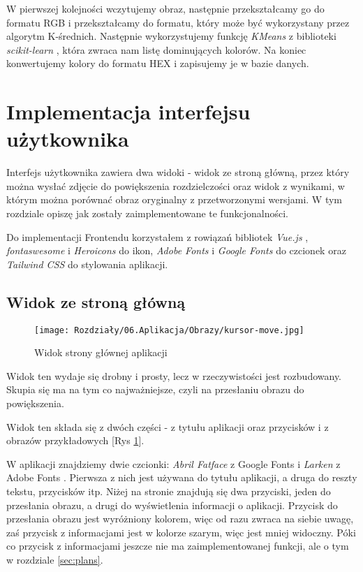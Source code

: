 W pierwszej kolejności wczytujemy obraz, następnie przekształcamy go do formatu RGB i przekształcamy do formatu, który może być wykorzystany przez algorytm K-średnich. Następnie wykorzystujemy funkcję \textit{KMeans} z biblioteki \textit{scikit-learn} \cite{sklearn}, która zwraca nam listę dominujących kolorów. Na koniec konwertujemy kolory do formatu HEX i zapisujemy je w bazie danych.



\section{Implementacja interfejsu użytkownika}

Interfejs użytkownika zawiera dwa widoki - widok ze stroną główną, przez który można wysłać zdjęcie do powiększenia rozdzielczości oraz widok z wynikami, w którym można porównać obraz oryginalny z przetworzonymi wersjami. W tym rozdziale opiszę jak zostały zaimplementowane te funkcjonalności.

Do implementacji Frontendu korzystałem z rowiązań bibliotek \textit{Vue.js} \cite{vue}, \textit{fontaswesome} \cite{fonta} i \textit{Heroicons} \cite{heroicons} do ikon, \textit{Adobe Fonts} \cite{adobefonts} i \textit{Google Fonts} \cite{googlefonts} do czcionek oraz \textit{Tailwind CSS} \cite{tailwind} do stylowania aplikacji.

\subsection*{Widok ze stroną główną}

\begin{figure}[H]
    \centering
    \texttt{[image: Rozdziały/06.Aplikacja/Obrazy/kursor-move.jpg]}  
    \caption{Widok strony głównej aplikacji}
    \label{fig:image88}
\end{figure}

Widok ten wydaje się drobny i prosty, lecz w rzeczywistości jest rozbudowany. Skupia się ma na tym co najważniejsze, czyli na przesłaniu obrazu do powiększenia.

Widok ten składa się z dwóch części - z tytułu aplikacji oraz przycisków i z obrazów przykładowych [Rys \ref{fig:image88}]. 

W aplikacji znajdziemy dwie czcionki: \textit{Abril Fatface} z Google Fonts \cite{googlefonts} i \textit{Larken} z Adobe Fonts \cite{adobefonts}. Pierwsza z nich jest używana do tytułu aplikacji, a druga do reszty tekstu, przycisków itp.
Niżej na stronie znajdują się dwa przyciski, jeden do przesłania obrazu, a drugi do wyświetlenia informacji o aplikacji. Przycisk do przesłania obrazu jest wyróżniony kolorem, więc od razu zwraca na siebie uwagę, zaś przycisk z informacjami jest w kolorze szarym, więc jest mniej widoczny. Póki co przycisk z informacjami jeszcze nie ma zaimplementowanej funkcji, ale o tym w rozdziale \ref{sec:plans}. 

